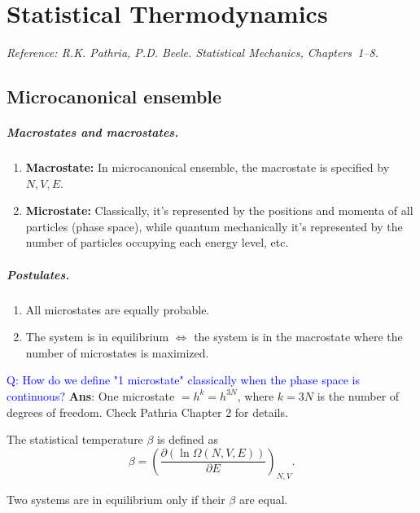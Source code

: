 \chapter{Statistical Thermodynamics}

\noindent\textit{Reference: R.K. Pathria, P.D. Beele. \emph{Statistical Mechanics}, Chapters~1--8.}
\section{Microcanonical ensemble}
\paragraph{Macrostates and macrostates.}
\begin{enumerate}
    \item \textbf{Macrostate:} In microcanonical ensemble, the macrostate is specified by $N,V,E$.
    \item \textbf{Microstate:} Classically, it's represented by the positions and momenta of all particles (phase space), while quantum mechanically it's represented by the number of particles occupying each energy level, etc.
\end{enumerate}

\paragraph{Postulates.}
\begin{enumerate}[label=(\arabic*)]
    \item All microstates are equally probable.
    \item The system is in equilibrium $\iff$ the system is in the macrostate where the number of microstates is maximized.
\end{enumerate}

\textcolor{blue}{Q: How do we define "1 microstate" classically when the phase space is continuous?}
\textbf{Ans}: One microstate $= h^{k} = h^{3N}$, where $k=3N$ is the number of degrees of freedom. 
Check Pathria Chapter 2 for details. 

\begin{definition}
The statistical temperature $\beta$ is defined as
\[
    \beta = \left(\frac{\partial(\ln\Omega(N,V,E))}{\partial E}\right)_{N,V}.
\]
\end{definition}

\begin{theorem}
Two systems are in equilibrium only if their $\beta$ are equal.
\end{theorem}

